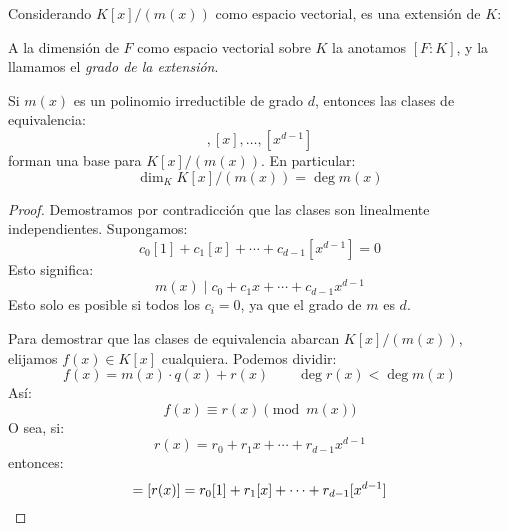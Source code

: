   Considerando \(K[x] / (m(x))\) como espacio vectorial,%
  es una extensión de \(K\):%
  \begin{definition}
    \label{def:extension-degree}
    A la dimensión de \(F\) como espacio vectorial sobre \(K\)
    la anotamos \([F : K]\),
    y la llamamos el \emph{grado de la extensión}.%
  \end{definition}
  \begin{lemma}
    \label{lem:irreducible-equivalence-classes}
    Si \(m(x)\) es un polinomio irreductible de grado \(d\),
    entonces las clases de equivalencia:
    \begin{equation*}
      [1], [x], \dotsc, [x^{d - 1}]
    \end{equation*}
    forman una base para \(K[x] / (m(x))\).
    En particular:
    \begin{equation*}
      \dim_K K[x] / (m(x)) = \deg m(x)
    \end{equation*}
  \end{lemma}
  \begin{proof}
    Demostramos por contradicción
    que las clases son linealmente independientes.%
    Supongamos:
    \begin{equation*}
      c_0 [1] + c_1 [x] + \dotsb + c_{d - 1} [x^{d - 1}]
	= 0
    \end{equation*}
    Esto significa:
    \begin{equation*}
      m(x) \mid c_0 + c_1 x + \dotsb + c_{d - 1} x^{d - 1}
    \end{equation*}
    Esto solo es posible si todos los \(c_i = 0\),
    ya que el grado de \(m\) es \(d\).

    Para demostrar que las clases de equivalencia
    abarcan \(K[x] / (m(x))\),
    elijamos \(f(x) \in K[x]\) cualquiera.
    Podemos dividir:%
    \begin{equation*}
      f(x) = m(x) \cdot q(x) + r(x)
      \qquad
      \deg r(x) < \deg m(x)
    \end{equation*}
    Así:
    \begin{equation*}
      f(x) \equiv r(x) \pmod{m(x)}
    \end{equation*}
    O sea,
    si:
    \begin{equation*}
      r(x)
	= r_0 + r_1 x + \dotsb + r_{d - 1} x^{d - 1}
    \end{equation*}
    entonces:
    \begin{equation*}
      [f(x)]
	= [r(x)]
	= r_0 [1] + r_1 [x] + \dotsb + r_{d - 1} [x^{d - 1}]
      \qedhere
    \end{equation*}
  \end{proof}
